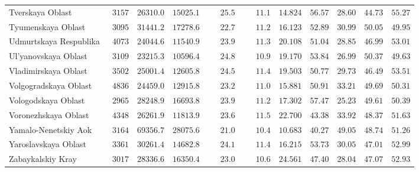\documentclass[12pt,a4paper]{article}
\begin{document}
{\begin{longtable}{lcccccccccc}
		Tverskaya Oblast  & $\phantom{0}3157$ & $26310.0$ & $15025.1$ & $\phantom{000}25.5$ & $\phantom{000}11.1$ & $14.824$ & $56.57$ & $28.60$ & $44.73$ & $55.27$ \\
		Tyumenskaya Oblast  & $\phantom{0}3095$ & $31441.2$ & $17278.6$ & $\phantom{000}22.7$ & $\phantom{000}11.2$ & $16.123$ & $52.89$ & $30.99$ & $50.05$ & $49.95$ \\
		Udmurtskaya Respublika  & $\phantom{0}4073$ & $24044.6$ & $11540.9$ & $\phantom{000}23.9$ & $\phantom{000}11.3$ & $20.108$ & $51.04$ & $28.85$ & $46.99$ & $53.01$ \\
		Ul'yanovskaya Oblast  & $\phantom{0}3109$ & $23215.3$ & $10596.4$ & $\phantom{000}24.8$ & $\phantom{000}10.9$ & $19.170$ & $53.84$ & $26.99$ & $50.37$ & $49.63$ \\
		Vladimirskaya Oblast  & $\phantom{0}3502$ & $25001.4$ & $12605.8$ & $\phantom{000}24.5$ & $\phantom{000}11.4$ & $19.503$ & $50.77$ & $29.73$ & $46.49$ & $53.51$ \\
		Volgogradskaya Oblast  & $\phantom{0}4836$ & $24459.0$ & $12915.8$ & $\phantom{000}23.2$ & $\phantom{000}11.0$ & $15.881$ & $50.91$ & $33.21$ & $49.69$ & $50.31$ \\
		Vologodskaya Oblast  & $\phantom{0}2965$ & $28248.9$ & $16693.8$ & $\phantom{000}23.9$ & $\phantom{000}11.2$ & $17.302$ & $57.47$ & $25.23$ & $49.61$ & $50.39$ \\
		Voronezhskaya Oblast  & $\phantom{0}4348$ & $26261.9$ & $11813.9$ & $\phantom{000}23.6$ & $\phantom{000}11.5$ & $22.700$ & $43.38$ & $33.92$ & $48.37$ & $51.63$ \\
		Yamalo-Nenetskiy Aok  & $\phantom{0}3164$ & $69356.7$ & $28075.6$ & $\phantom{000}21.0$ & $\phantom{000}10.4$ & $10.683$ & $40.27$ & $49.05$ & $48.74$ & $51.26$ \\
		Yaroslavskaya Oblast  & $\phantom{0}3361$ & $30261.4$ & $14682.8$ & $\phantom{000}24.1$ & $\phantom{000}11.4$ & $16.215$ & $53.73$ & $30.05$ & $47.01$ & $52.99$ \\
		Zabaykalskiy Kray  & $\phantom{0}3017$ & $28336.6$ & $16350.4$ & $\phantom{000}23.0$ & $\phantom{000}10.6$ & $24.561$ & $47.40$ & $28.04$ & $47.07$ & $52.93$ \\
		\hline 
	\end{longtable}
}
\end{document}

